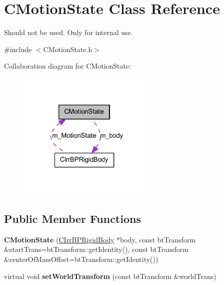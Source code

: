 \hypertarget{class_c_motion_state}{
\section{CMotionState Class Reference}
\label{class_c_motion_state}
}


Should not be used. Only for internal use.  




{\ttfamily \#include $<$CMotionState.h$>$}



Collaboration diagram for CMotionState:\nopagebreak
\begin{figure}[H]
\begin{center}
\leavevmode
\includegraphics[width=189pt]{class_c_motion_state__coll__graph}
\end{center}
\end{figure}
\subsection*{Public Member Functions}
\begin{DoxyCompactItemize}
\item 
\hypertarget{class_c_motion_state_a0352d243092a662ad672cf5621040adf}{
{\bfseries CMotionState} (\hyperlink{class_c_irr_b_p_rigid_body}{CIrrBPRigidBody} $\ast$body, const btTransform \&startTrans=btTransform::getIdentity(), const btTransform \&centerOfMassOffset=btTransform::getIdentity())}
\label{class_c_motion_state_a0352d243092a662ad672cf5621040adf}

\item 
\hypertarget{class_c_motion_state_a25a63325dc9bd847440d0fc83af77ee6}{
virtual void {\bfseries setWorldTransform} (const btTransform \&worldTrans)}
\label{class_c_motion_state_a25a63325dc9bd847440d0fc83af77ee6}

\end{DoxyCompactItemize}
